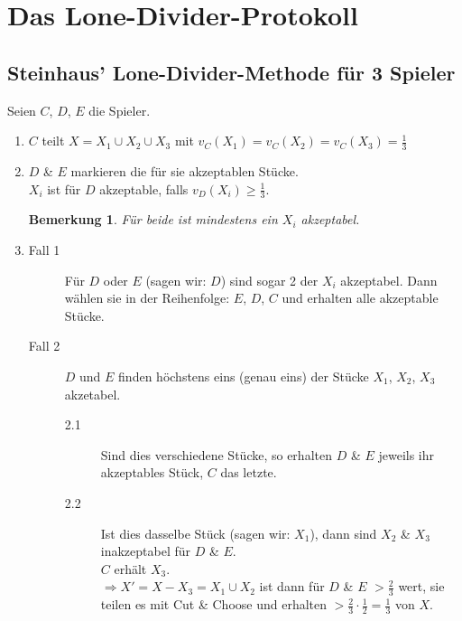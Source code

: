 \documentclass[a4paper,10pt]{scrartcl}
\newtheorem*{bemerkung*}{Bemerkung}
\begin{document}
\section{Das Lone-Divider-Protokoll}
\subsection{Steinhaus' Lone-Divider-Methode für 3 Spieler}
Seien $C$, $D$, $E$ die Spieler.
\begin{enumerate}
 \item $C$ teilt $X=X_1\cup X_2\cup X_3$ mit $v_C(X_1)=v_C(X_2)=v_C(X_3)=\frac{1}{3}$
 \item $D$ \& $E$ markieren die für sie akzeptablen Stücke.\\
       $X_i$ ist für $D$ akzeptable, falls $v_D(X_i)\geq\frac{1}{3}$.
       \begin{bemerkung*}
        Für beide ist mindestens ein $X_i$ akzeptabel.
       \end{bemerkung*}
 \item \begin{description}
        \item[Fall 1] Für $D$ oder $E$ (sagen wir: $D$) sind sogar 2 der $X_i$ akzeptabel. Dann wählen sie in der Reihenfolge: $E$, $D$, $C$
                      und erhalten alle akzeptable Stücke.
        \item[Fall 2] $D$ und $E$ finden höchstens eins (genau eins) der Stücke $X_1$, $X_2$, $X_3$ akzetabel.
                      \begin{description}
                       \item[2.1] Sind dies verschiedene Stücke, so erhalten $D$ \& $E$ jeweils ihr akzeptables Stück, $C$ das letzte.
                       \item[2.2] Ist dies dasselbe Stück (sagen wir: $X_1$), dann sind $X_2$ \& $X_3$ inakzeptabel für $D$ \& $E$.\\
                                  $C$ erhält $X_3$.\\
                                  $\Rightarrow X'=X-X_3=X_1\cup X_2$ ist dann für $D$ \& $E$ $>\frac{2}{3}$ wert, sie teilen es mit
                                  Cut \& Choose und erhalten $>\frac{2}{3}\cdot\frac{1}{2}=\frac{1}{3}$ von $X$.
                      \end{description}
       \end{description}
\end{enumerate}
\end{document}
